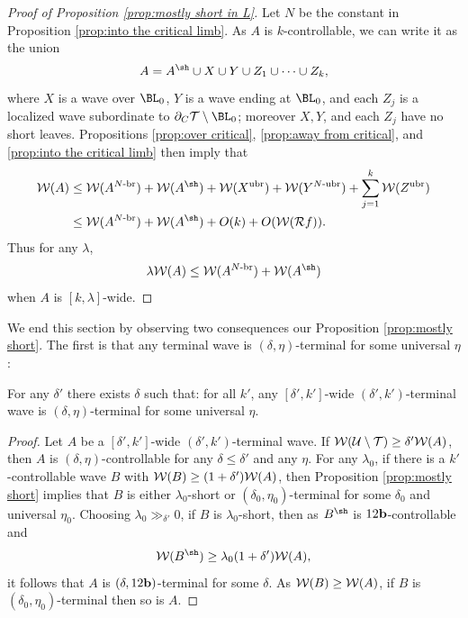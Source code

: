 \documentclass[12pt]{amsart}
\begin{document}
\begin{proof}[Proof of Proposition \ref{prop:mostly short in L}]
	Let $N$ be the constant in Proposition \ref{prop:into the critical limb}. 
	As $A$ is $k$-controllable, we can write it as the union $$A= A^\sh \cup X\cup Y \cup Z_1\cup \cdots \cup Z_k,$$
	where $X$ is a wave over $\BL_0$, $Y$ is a wave ending at $\BL_0$, and each $Z_j$ is a localized wave subordinate to $\dcara\TT \sm \BL_0$; moreover $X, Y$, and each $Z_j$ have no short leaves. 
	Propositions \ref{prop:over critical}, \ref{prop:away from critical}, and \ref{prop:into the critical limb} then imply that
	\begin{align*}
		\WW(A)&\leq \WW(A^{N\mathhyphen\br})+\WW(A^\sh)+ \WW(X^{\nbr})+ \WW(Y^{N\mathhyphen\nbr})+ \sum_{j=1}^k \WW(Z^\nbr)\\
		&\leq \WW(A^{N\mathhyphen\br})+\WW(A^\sh)+O(k)+ O(\WW(\RR f)).
	\end{align*}
	Thus for any $\lambda$, 
	$$\lambda \WW(A)\leq  \WW(A^{N\mathhyphen\br})+\WW(A^\sh)$$
	when $A$ is $[k, \lambda]$-wide.
\end{proof}



We end this section by observing  two consequences our Proposition \ref{prop:mostly short}. The first is that any terminal wave is $(\delta, \eta)$-terminal for some universal $\eta$:

\begin{cor}\label{cor:universal terminal}
	For any $\delta'$ there exists $\delta$ such that: for all $k'$, any $[\delta', k']$-wide $(\delta', k')$-terminal wave is $(\delta, \eta)$-terminal for some universal $\eta$. 
\end{cor}

\begin{proof}
	Let $A$ be a $[\delta', k']$-wide $(\delta', k')$-terminal wave.
	If $\mathcal W(\mathcal U\setminus \mathcal T)\geq \delta'\mathcal W(A)$, then $A$ is $(\delta, \eta)$-controllable for any $\delta\leq \delta'$ and any $\eta$. For any $\lambda_0$, if there is a $k'$-controllable wave $B$ with $\mathcal W(B)\geq (1+\delta')\mathcal W(A)$, then  Proposition \ref{prop:mostly short} implies that $B$ is either $\lambda_0$-short or $(\delta_0, \eta_0)$-terminal for some $\delta_0$ and universal $\eta_0$. 
	Choosing $\lambda_0 \gg_{\delta'} 0$, if $B$ is $\lambda_0$-short, then as $B^\sh$ is $12\mathbf b$-controllable and  $$\WW(B^\sh)\geq \lambda_0(1+\delta')\WW(A),$$
	it follows that $A$ is $(\delta, 12\mathbf b)$-terminal for some $\delta$.
	As $\mathcal W(B)\geq \mathcal W(A)$, if $B$ is $(\delta_0, \eta_0)$-terminal then so is $A$.
\end{proof}
\end{document}
